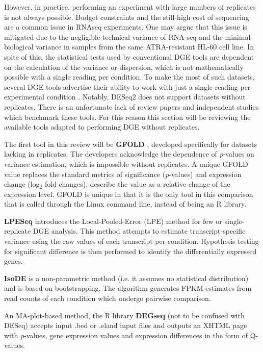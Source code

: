 However, in practice, performing an experiment with large numbers of replicates is not always possible. Budget constraints and the still-high cost of sequencing are a common issue in RNAseq experiments. One may argue that this issue is mitigated due to the negligible technical variance of RNA-seq \citep{bullard2010evaluation} and the minimal biological variance in samples from the same \ac{ATRA}-resistant HL-60 cell line. In spite of this, the statistical tests used by conventional \ac{DGE} tools are dependent on the calculation of the variance or dispersion, which is not mathematically possible with a single reading per condition. To make the most of such datasets, several \ac{DGE} tools advertise their ability to work with just a single reading per experimental condition \citep{feng2012gfold, gim2016lpeseq, anders2010differential, wang2010degseq, al2014bootstrap}. Notably, DESeq2 does not support datasets without replicates. There is an unfortunate lack of review papers and independent studies which benchmark these tools. For this reason this section will be reviewing the available tools adapted to performing \ac{DGE} without replicates.

The first tool in this review will be \textbf{GFOLD} \citep{feng2012gfold}, developed specifically for datasets lacking in replicates. The developers acknowledge the dependence of \textit{p}-values on variance estimation, which is impossible without replicates. A unique GFOLD value replaces the standard metrics of significance (\textit{p}-values) and expression change (log$_2$ fold changes). \cite{feng2012gfold} describe the value as a relative change of the expression level. GFOLD is unique in that it is the only tool in this comparison that is called through the Linux command line, instead of being an R library.

\textbf{LPESeq} \citep{gim2016lpeseq} introduces the Local-Pooled-Error (LPE) method for few or single-replicate \ac{DGE} analysis. This method attempts to estimate transcript-specific variance using the raw values of each transcript per condition. Hypothesis testing for significant difference is then performed to identify the differentially expressed genes.

\textbf{IsoDE} \citep{al2014bootstrap} is a non-parametric method (i.e. it assumes no statistical distribution) and is based on bootstrapping. The algorithm generates FPKM estimates from read counts of each condition which undergo pairwise comparison.

An MA-plot-based method, the R library \textbf{DEGseq} \citep{wang2010degseq} (not to be confused with DESeq) accepts input .bed or .eland input files and outputs an XHTML page with \textit{p}-values, gene expression values and expression differences in the form of Q-values.

